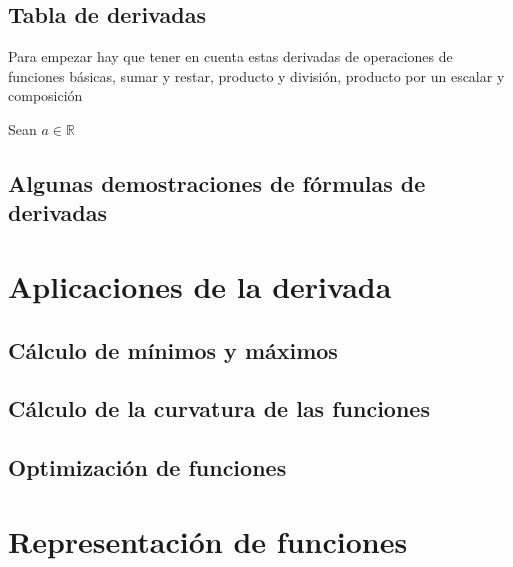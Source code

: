 \newpage
\section{Tabla de derivadas}

Para empezar hay que tener en cuenta estas derivadas de operaciones de funciones básicas, sumar y restar, producto y división, producto por un escalar y composición

\noindent
Sean $a \in \mathbb{R}$ 

\section{Algunas demostraciones de fórmulas de derivadas}
\newpage

\section{}
\chapter{Aplicaciones de la derivada}
\minitoc

\newpage
\section{Cálculo de mínimos y máximos}
\section{Cálculo de la curvatura de las funciones}
\section{Optimización de funciones}
\chapter{Representación de funciones}
\minitoc

\newpage
